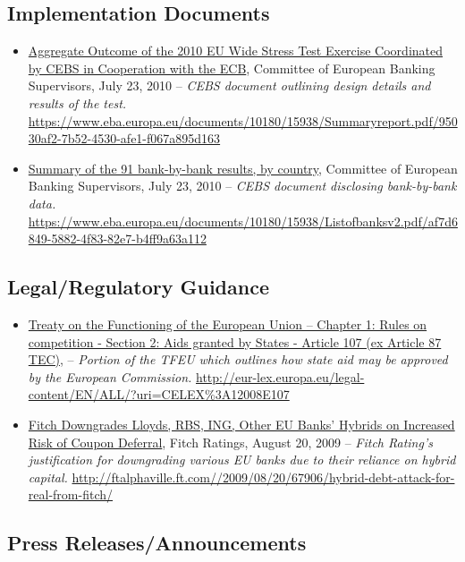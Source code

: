\documentclass[12pt]{article}
\begin{document}
\subsection{Implementation Documents}
\begin{itemize}
\item
\ul{Aggregate Outcome of the 2010 EU Wide Stress Test Exercise Coordinated by CEBS in Cooperation with the ECB}, Committee of European Banking Supervisors, July 23, 2010 -- \emph{CEBS
  document outlining design details and results of the test.} \url{https://www.eba.europa.eu/documents/10180/15938/Summaryreport.pdf/95030af2-7b52-4530-afe1-f067a895d163}
\item
\ul{Summary of the 91 bank-by-bank results, by country}, Committee of European Banking Supervisors, July 23, 2010 -- \emph{CEBS
  document disclosing bank-by-bank data.} \url{https://www.eba.europa.eu/documents/10180/15938/Listofbanksv2.pdf/af7d6849-5882-4f83-82e7-b4ff9a63a112}
\end{itemize}

\subsection{Legal/Regulatory Guidance}

\begin{itemize}
\item
\ul{Treaty on the Functioning of the European Union -- Chapter 1: Rules on competition - Section 2: Aids granted by States - Article 107 (ex Article 87 TEC)}, -- \emph{Portion of the TFEU which outlines how state aid may be approved by the European Commission.} \url{http://eur-lex.europa.eu/legal-content/EN/ALL/?uri=CELEX\%3A12008E107}
\item
\ul{Fitch Downgrades Lloyds, RBS, ING, Other EU Banks' Hybrids on Increased Risk of Coupon Deferral}, Fitch Ratings, August 20, 2009 -- \emph{Fitch Rating's justification for downgrading various EU banks due to their reliance on hybrid capital.} \url{http://ftalphaville.ft.com//2009/08/20/67906/hybrid-debt-attack-for-real-from-fitch/}
\end{itemize}

\subsection{Press Releases/Announcements}
\end{document}
